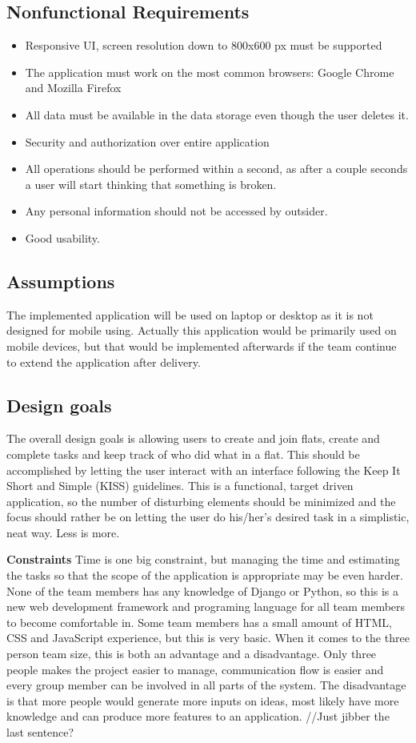 \documentclass{sig-alt-release2}
\begin{document}
\subsection{Nonfunctional Requirements}
\begin{itemize}
\item Responsive UI, screen resolution down to 800x600 px must be supported
\item The application must work on the most common browsers: Google Chrome and Mozilla Firefox 
\item All data must be available in the data storage even though the user deletes it.
\item Security and authorization over entire application
\item All operations should be performed within a second, as after a couple seconds a user will start thinking that something is broken.
\item Any personal information should not be accessed by outsider.
\item Good usability.
\end{itemize}

\subsection{Assumptions}

The implemented application will be used on laptop or desktop as it is not designed for mobile using. Actually this application would be primarily used on mobile devices, but that would be implemented afterwards if the team continue to extend the application after delivery. 

\subsection{Design goals}

The overall design goals is allowing users to create and join flats, create and complete tasks and keep track of who did what in a flat. This should be accomplished by letting the user interact with an interface following the Keep It Short and Simple (KISS) guidelines. This is a functional, target driven application, so the number of disturbing elements should be minimized and the focus should rather be on letting the user do his/her's desired task in a simplistic, neat way. Less is more. 

\textbf{Constraints}
Time is one big constraint, but managing the time and estimating the tasks so that the scope of the application is appropriate may be even harder. None of the team members has any knowledge of Django or Python, so this is a new web development framework and programing language for all team members to become comfortable in. Some team members has a small amount of HTML, CSS and JavaScript experience, but this is very basic. When it comes to the three person team size, this is both an advantage and a disadvantage. Only three people makes the project easier to manage, communication flow is easier and every group member can be involved in all parts of the system. The disadvantage is that more people would generate more inputs on ideas, most likely have more knowledge and can produce more features to an application. //Just jibber the last sentence? 
\end{document}
